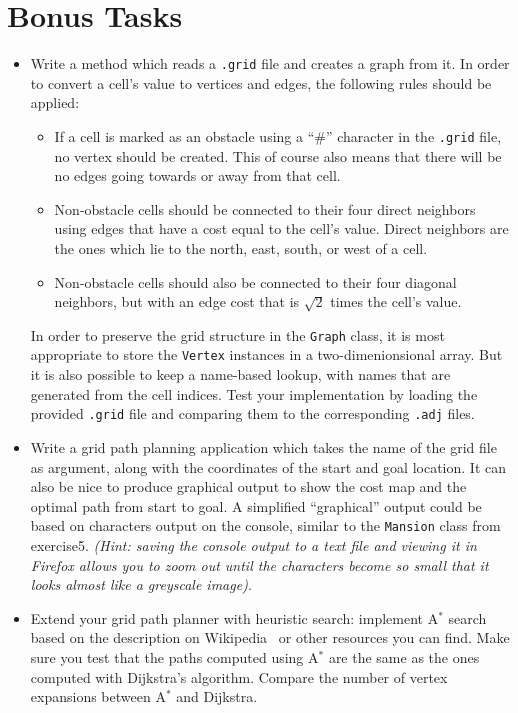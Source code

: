 \documentclass[a4paper,10pt]{article}
\begin{document}
\section{Bonus Tasks}

\begin{itemize}

\item
  Write a method which reads a \texttt{.grid} file and creates a graph from it.
  In order to convert a cell's value to vertices and edges, the following rules should be applied:
  \begin{itemize}
  \item
    If a cell is marked as an obstacle using a ``\#'' character in the \texttt{.grid} file, no vertex should be created.
    This of course also means that there will be no edges going towards or away from that cell.
  \item
    Non-obstacle cells should be connected to their four direct neighbors using edges that have a cost equal to the cell's value.
    Direct neighbors are the ones which lie to the north, east, south, or west of a cell.
  \item
    Non-obstacle cells should also be connected to their four diagonal neighbors, but with an edge cost that is $\sqrt{2}$ times the cell's value.
  \end{itemize}
  In order to preserve the grid structure in the \texttt{Graph} class, it is most appropriate to store the \texttt{Vertex} instances in a two-dimenionsional array.
  But it is also possible to keep a name-based lookup, with names that are generated from the cell indices.
  Test your implementation by loading the provided \texttt{.grid} file and comparing them to the corresponding \texttt{.adj} files.

\item
  Write a grid path planning application which takes the name of the grid file as argument, along with the coordinates of the start and goal location.
  It can also be nice to produce graphical output to show the cost map and the optimal path from start to goal.
  A simplified ``graphical'' output could be based on characters output on the console, similar to the \texttt{Mansion} class from exercise5.
  \emph{(Hint: saving the console output to a text file and viewing it in Firefox allows you to zoom out until the characters become so small that it looks almost like a greyscale image).}
  
\item
  Extend your grid path planner with heuristic search:
  implement A$^*$ search based on the description on Wikipedia~\cite{wikipedia:astar} or other resources you can find.
  Make sure you test that the paths computed using A$^*$ are the same as the ones computed with Dijkstra's algorithm.
  Compare the number of vertex expansions between A$^*$ and Dijkstra.
  
\end{itemize}



\footnotesize


\end{document}
